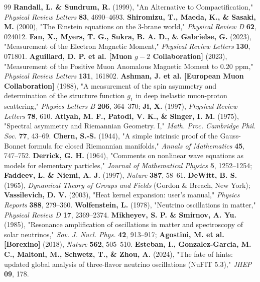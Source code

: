 \documentclass[10pt,a4paper]{article}
\begin{document}
\begin{thebibliography}{99}
 \textbf{Randall, L. \& Sundrum, R.} (1999), "An Alternative to Compactification," \textit{Physical Review Letters} \textbf{83}, 4690–4693.
 \textbf{Shiromizu, T., Maeda, K., \& Sasaki, M.} (2000), "The Einstein equations on the 3-brane world," \textit{Physical Review D} \textbf{62}, 024012.
 \textbf{Fan, X., Myers, T. G., Sukra, B. A. D., \& Gabrielse, G.} (2023), "Measurement of the Electron Magnetic Moment," \textit{Physical Review Letters} \textbf{130}, 071801.
 \textbf{Aguillard, D. P. et al. [Muon $g-2$ Collaboration]} (2023), "Measurement of the Positive Muon Anomalous Magnetic Moment to 0.20 ppm," \textit{Physical Review Letters} \textbf{131}, 161802.
 \textbf{Ashman, J. et al. [European Muon Collaboration]} (1988), "A measurement of the spin asymmetry and determination of the structure function $g_1$ in deep inelastic muon-proton scattering," \textit{Physics Letters B} \textbf{206}, 364–370; \textbf{Ji, X.} (1997), \textit{Physical Review Letters} \textbf{78}, 610.
 \textbf{Atiyah, M. F., Patodi, V. K., \& Singer, I. M.} (1975), "Spectral asymmetry and Riemannian Geometry. I," \textit{Math. Proc. Cambridge Phil. Soc.} \textbf{77}, 43–69.
 \textbf{Chern, S.-S.} (1944), "A simple intrinsic proof of the Gauss-Bonnet formula for closed Riemannian manifolds," \textit{Annals of Mathematics} \textbf{45}, 747–752.
 \textbf{Derrick, G. H.} (1964), "Comments on nonlinear wave equations as models for elementary particles," \textit{Journal of Mathematical Physics} \textbf{5}, 1252–1254; \textbf{Faddeev, L. \& Niemi, A. J.} (1997), \textit{Nature} \textbf{387}, 58–61.
 \textbf{DeWitt, B. S.} (1965), \textit{Dynamical Theory of Groups and Fields} (Gordon \& Breach, New York); \textbf{Vassilevich, D. V.} (2003), "Heat kernel expansion: user's manual," \textit{Physics Reports} \textbf{388}, 279–360.
 \textbf{Wolfenstein, L.} (1978), "Neutrino oscillations in matter," \textit{Physical Review D} \textbf{17}, 2369–2374.
 \textbf{Mikheyev, S. P. \& Smirnov, A. Yu.} (1985), "Resonance amplification of oscillations in matter and spectroscopy of solar neutrinos," \textit{Sov. J. Nucl. Phys.} \textbf{42}, 913–917; \textbf{Agostini, M. et al. [Borexino]} (2018), \textit{Nature} \textbf{562}, 505–510.
 \textbf{Esteban, I., Gonzalez-Garcia, M. C., Maltoni, M., Schwetz, T., \& Zhou, A.} (2024), "The fate of hints: updated global analysis of three-flavor neutrino oscillations (NuFIT 5.3)," \textit{JHEP} \textbf{09}, 178.

\end{thebibliography}
\end{document}
